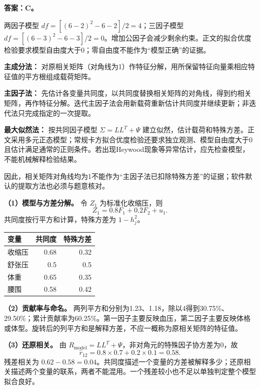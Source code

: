 
\textbf{答案：C。}

两因子模型 \(df=[(6-2)^2-6-2]/2=4\)；三因子模型 \(df=[(6-3)^2-6-3]/2=0\)。增加公因子会减少剩余约束。正文的拟合优度检验要求模型自由度大于0；零自由度不能作为``模型正确''的证据。





\textbf{主成分法：} 对原相关矩阵（对角线为1）作特征分解，用所保留特征向量乘相应特征值的平方根组成载荷矩阵。

\textbf{主因子法：} 先估计各变量共同度，以共同度替换相关矩阵的对角线，得到约相关矩阵，再作特征分解。迭代主因子法会用新载荷重新估计共同度并继续更新；非迭代法只完成指定的一次提取。

\textbf{最大似然法：} 按共同因子模型 \(\Sigma=LL^T+\Psi\) 建立似然，估计载荷和特殊方差。正文采用多元正态模型；常规卡方拟合优度检验还要求独立观测、模型自由度大于0且估计满足通常的正则条件。若出现Heywood现象等异常估计，应先检查模型，不能机械解释检验结果。

因此，相关矩阵对角线均为1不能作为``主因子法已扣除特殊方差''的证据；软件默认的提取方法也必须与题意核对。





\textbf{（1）模型与方差分解。} 令 \(Z_1\) 为标准化收缩压，则 \[Z_1=0.8F_1+0.2F_2+u_1.\] 共同度按行平方和计算，特殊方差为 \(1-h_j^2\)。

\begin{center}\small\setlength{\tabcolsep}{4pt}\renewcommand{\arraystretch}{1.18}\begin{tabular}{@{}lrr@{}}
\toprule
变量 & 共同度 & 特殊方差 \\
\midrule

收缩压 & 0.68 & 0.32 \\
舒张压 & 0.5 & 0.5 \\
体重 & 0.65 & 0.35 \\
腰围 & 0.58 & 0.42 \\
\bottomrule\end{tabular}\end{center}

\textbf{（2）贡献率与命名。} 两列平方和分别为1.23、1.18，除以4得到30.75\%、29.50\%；累计贡献率为60.25\%。第一因子主要反映血压，第二因子主要反映体格或体型。旋转后的列平方和是解释方差，不应一概称为原相关矩阵的特征值。

\textbf{（3）还原相关。} 由 \(R_{\mathrm{model}}=LL^T+\Psi\)，非对角元的特殊因子协方差为0，故 \[\widehat r_{12}=0.8\times0.7+0.2\times0.1=0.58.\] 残差相关为 \(0.62-0.58=0.04\)。共同度描述一个变量的方差被解释多少；还原相关描述两个变量的联系，两者不能混用。一个残差较小也不足以单独判定整个模型拟合良好。

